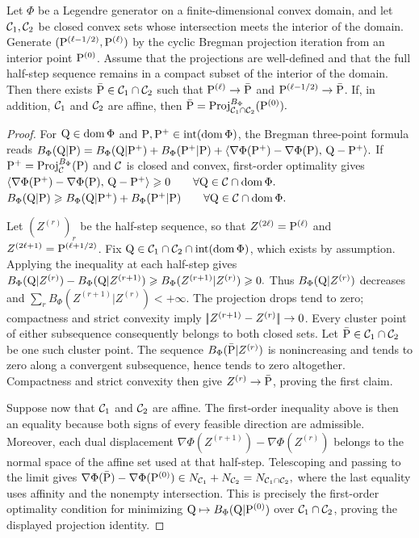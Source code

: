 \begin{prop}\label{prop-cyclic-kl-affine}
Let $\Phi$ be a Legendre generator on a finite-dimensional convex domain, and let $\Cc_1,\Cc_2$ be closed convex sets whose intersection meets the interior of the domain. Generate $(\P^{(\ell-1/2)},\P^{(\ell)})$ by the cyclic Bregman projection iteration from an interior point $\P^{(0)}$. Assume that the projections are well-defined and that the full half-step sequence remains in a compact subset of the interior of the domain. Then there exists $\bar\P\in\Cc_1\cap\Cc_2$ such that $\P^{(\ell)}\to\bar\P$ and $\P^{(\ell-1/2)}\to\bar\P$.
If, in addition, $\Cc_1$ and $\Cc_2$ are affine, then
\(\bar\P = \Proj_{\Cc_1\cap\Cc_2}^{B_\Phi}(\P^{(0)}).\)
\end{prop}
\begin{proof}
For $\Q\in\operatorname{dom}\Phi$ and $\P,\P^+\in\operatorname{int}(\operatorname{dom}\Phi)$, the Bregman three-point formula reads
\(B_\Phi(\Q|\P) = B_\Phi(\Q|\P^+) + B_\Phi(\P^+|\P) + \dotp{\nabla\Phi(\P^+)-\nabla\Phi(\P)}{\Q-\P^+}.\)
If $\P^+=\Proj_\Cc^{B_\Phi}(\P)$ and $\Cc$ is closed and convex, first-order optimality gives \(\dotp{\nabla\Phi(\P^+)-\nabla\Phi(\P)}{\Q-\P^+}\geq0 \qquad \forall \Q\in\Cc\cap\operatorname{dom}\Phi.\)
\(B_\Phi(\Q|\P) \geq B_\Phi(\Q|\P^+)+B_\Phi(\P^+|\P) \qquad\forall \Q\in\Cc\cap\operatorname{dom}\Phi.\)

Let $(Z^{(r)})_r$ be the half-step sequence, so that $Z^{(2\ell)}=\P^{(\ell)}$ and $Z^{(2\ell+1)}=\P^{(\ell+1/2)}$. Fix $\Q\in\Cc_1\cap\Cc_2\cap\operatorname{int}(\operatorname{dom}\Phi)$, which exists by assumption. Applying the inequality at each half-step gives
\(B_\Phi(\Q|Z^{(r)})-B_\Phi(\Q|Z^{(r+1)}) \geq B_\Phi(Z^{(r+1)}|Z^{(r)})\geq0.\)
Thus $B_\Phi(\Q|Z^{(r)})$ decreases and $\sum_r B_\Phi(Z^{(r+1)}|Z^{(r)})<+\infty$. The projection drops tend to zero; compactness and strict convexity imply $\norm{Z^{(r+1)}-Z^{(r)}}\to0$. Every cluster point of either subsequence consequently belongs to both closed sets. Let $\bar\P\in\Cc_1\cap\Cc_2$ be one such cluster point. The sequence $B_\Phi(\bar\P|Z^{(r)})$ is nonincreasing and tends to zero along a convergent subsequence, hence tends to zero altogether. Compactness and strict convexity then give $Z^{(r)}\to\bar\P$, proving the first claim.

Suppose now that $\Cc_1$ and $\Cc_2$ are affine. The first-order inequality above is then an equality because both signs of every feasible direction are admissible. Moreover, each dual displacement
\(\nabla\Phi(Z^{(r+1)})-\nabla\Phi(Z^{(r)})\)
belongs to the normal space of the affine set used at that half-step. Telescoping and passing to the limit gives \(\nabla\Phi(\bar \P)-\nabla\Phi(\P^{(0)}) \in N_{\Cc_1}+N_{\Cc_2} = N_{\Cc_1\cap\Cc_2},\)
where the last equality uses affinity and the nonempty intersection. This is precisely the first-order optimality condition for minimizing $\Q\mapsto B_\Phi(\Q|\P^{(0)})$ over $\Cc_1\cap\Cc_2$, proving the displayed projection identity.
\end{proof}
